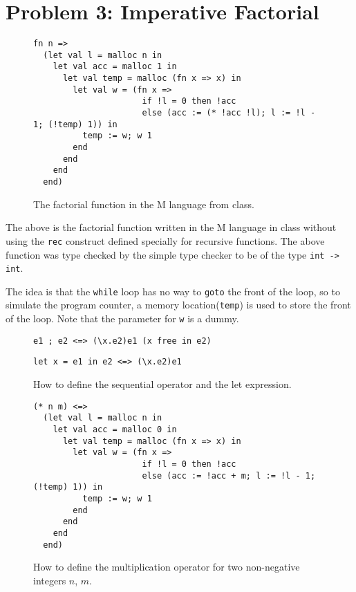 \documentclass{article}
\begin{document}
\section{Problem 3: Imperative Factorial}
\begin{figure}[htb]
\centering
\begin{BVerbatim}
fn n =>
  (let val l = malloc n in
    let val acc = malloc 1 in
      let val temp = malloc (fn x => x) in
        let val w = (fn x => 
                      if !l = 0 then !acc
                      else (acc := (* !acc !l); l := !l - 1; (!temp) 1)) in
          temp := w; w 1
        end
      end
    end
  end)
\end{BVerbatim}
\caption{The factorial function in the M language from class.}
\end{figure}

The above is the factorial function written in the M language in class without using the \texttt{rec} construct defined specially for recursive functions. The above function was type checked by the simple type checker to be of the type \texttt{int -> int}.

The idea is that the \texttt{while} loop has no way to \texttt{goto} the front of the loop, so to simulate the program counter, a memory location(\texttt{temp}) is used to store the front of the loop. Note that the parameter for \texttt{w} is a dummy.

\begin{figure}[htb]
\centering
\begin{BVerbatim}
e1 ; e2 <=> (\x.e2)e1 (x free in e2)
\end{BVerbatim}

\begin{BVerbatim}
let x = e1 in e2 <=> (\x.e2)e1
\end{BVerbatim}
\caption{How to define the sequential operator and the let expression.}
\end{figure}

\begin{figure}[htb]
\centering
\begin{BVerbatim}
(* n m) <=> 
  (let val l = malloc n in
    let val acc = malloc 0 in
      let val temp = malloc (fn x => x) in
        let val w = (fn x => 
                      if !l = 0 then !acc
                      else (acc := !acc + m; l := !l - 1; (!temp) 1)) in
          temp := w; w 1
        end
      end
    end
  end)
\end{BVerbatim}
\caption{How to define the multiplication operator for two non-negative integers $n$, $m$.}
\end{figure}
\end{document}
